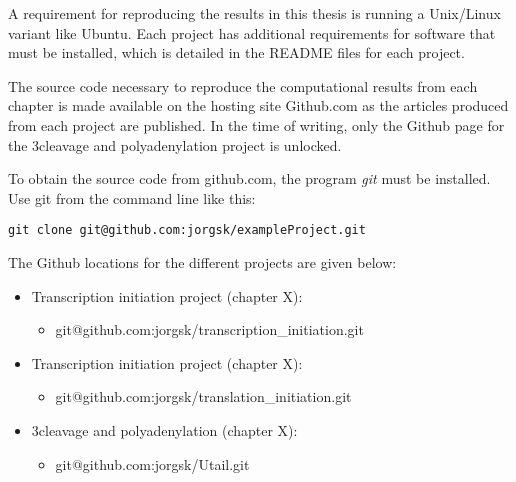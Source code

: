 %
A requirement for reproducing the results in this thesis is running a
Unix/Linux variant like Ubuntu. Each project has additional requirements for
software that must be installed, which is detailed in the README files for each
project.

The source code necessary to reproduce the computational results from each
chapter is made available on the hosting site Github.com as the articles
produced from each project are published. In the time of writing, only the
Github page for the 3\ppp cleavage and polyadenylation project is unlocked.

To obtain the source code from github.com, the program \textit{git} must be
installed. Use git from the command line like this:

\begin{verbatim}
git clone git@github.com:jorgsk/exampleProject.git
\end{verbatim}

The Github locations for the different projects are given below:

\begin{itemize}
	\item Transcription initiation project (chapter X):
		\begin{itemize}
			\item git@github.com:jorgsk/transcription_initiation.git
		\end{itemize}
	\item Transcription initiation project (chapter X):
		\begin{itemize}
			\item git@github.com:jorgsk/translation_initiation.git 
		\end{itemize}
	\item 3\ppp cleavage and polyadenylation (chapter X):
		\begin{itemize}
			\item git@github.com:jorgsk/Utail.git
		\end{itemize}
\end{itemize}

